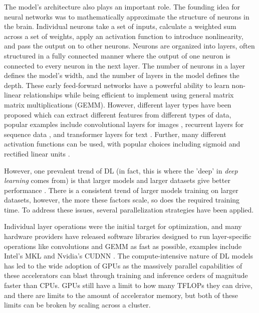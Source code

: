 The model's architecture also plays an important role.
The founding idea for neural networks was to mathematically approximate the structure of neurons in the brain.
Individual neurons take a set of inputs, calculate a weighted sum across a set of weights, apply an activation function to introduce nonlinearity, and pass the output on to other neurons. 
Neurons are organized into layers, often structured in a fully connected manner where the output of one neuron is connected to every neuron in the next layer.
The number of neurons in a layer defines the model's width, and the number of layers in the model defines the depth.
These early feed-forward networks have a powerful ability to learn non-linear relationships while being efficient to implement using general matrix matrix multiplications (GEMM).
However, different layer types have been proposed which can extract different features from different types of data, popular examples include convolutional layers for images \cite{Krizhevsky2012AlexNet}, recurrent layers for sequence data \cite{cho2014PhraseRepresentationRNN}, and transformer layers for text \cite{Vaswani2017AttentionTransformer}.
Further, many different activation functions can be used, with popular choices including sigmoid and rectified linear units \cite{Nair2010ReLU}.

However, one prevalent trend of DL (in fact, this is where the 'deep' in \textit{deep learning} comes from) is that larger models and larger datasets give better performance \cite{Kaplan2020ScalingLawsForNLModels, Ben-Nun2019DemystifyDL}.
There is a consistent trend of larger models training on larger datasets, however, the more these factors scale, so does the required training time.
To address these issues, several parallelization strategies have been applied.

Individual layer operations were the initial target for optimization, and many hardware providers have released software libraries designed to run layer-specific operations like convolutions and GEMM as fast as possible, examples include Intel's MKL and Nvidia's CUDNN \cite{MKL, cuDNN}. 
The compute-intensive nature of DL models has led to the wide adoption of GPUs as the massively parallel capabilities of these accelerators can blast through training and inference orders of magnitude faster than CPUs.
GPUs still have a limit to how many TFLOPs they can drive, and there are limits to the amount of accelerator memory, but both of these limits can be broken by scaling across a cluster.

